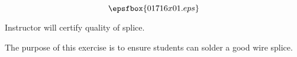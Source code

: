 

$$\epsfbox{01716x01.eps}$$

\vfil \eject






Instructor will certify quality of splice.







The purpose of this exercise is to ensure students can solder a good wire splice.




